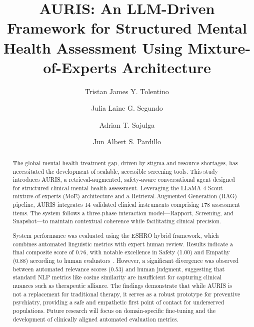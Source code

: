 \documentclass[sigconf]{acmart}
\begin{document}
\title{AURIS: An LLM-Driven Framework for Structured Mental Health Assessment Using Mixture-of-Experts Architecture}

\author{Tristan James Y. Tolentino}

\author{Julia Laine G. Segundo}

\author{Adrian T. Sajulga}

\author{Jun Albert S. Pardillo}

\begin{abstract}
The global mental health treatment gap, driven by stigma and resource shortages, has necessitated the development of scalable, accessible screening tools. This study introduces AURIS, a retrieval-augmented, safety-aware conversational agent designed for structured clinical mental health assessment. Leveraging the LLaMA 4 Scout mixture-of-experts (MoE) architecture and a Retrieval-Augmented Generation (RAG) pipeline, AURIS integrates 14 validated clinical instruments comprising 178 assessment items. The system follows a three-phase interaction model---Rapport, Screening, and Snapshot---to maintain contextual coherence while facilitating clinical precision.

System performance was evaluated using the ESHRO hybrid framework, which combines automated linguistic metrics with expert human review. Results indicate a final composite score of 0.76, with notable excellence in Safety (1.00) and Empathy (0.88) according to human evaluators~\cite{sherwani_eshro_2025}. However, a significant divergence was observed between automated relevance scores (0.53) and human judgment, suggesting that standard NLP metrics like cosine similarity are insufficient for capturing clinical nuances such as therapeutic alliance. The findings demonstrate that while AURIS is not a replacement for traditional therapy, it serves as a robust prototype for preventive psychiatry, providing a safe and empathetic first point of contact for underserved populations. Future research will focus on domain-specific fine-tuning and the development of clinically aligned automated evaluation metrics.
\end{abstract}
\end{document}
